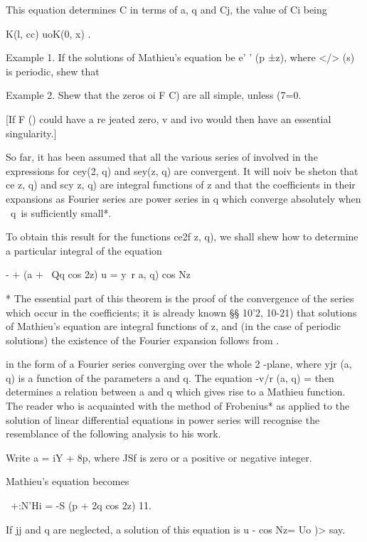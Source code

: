 This equation determines C in terms of a, q and Cj, the value of Ci
being

K(l, cc) uoK(0, x) .

Example 1. If the solutions of Mathieu's equation be e' ' (p ±z),
where </> (s) is periodic, shew that

Example 2. Shew that the zeros oi F C) are all simple, unless (7=0.


[If F () could have a re jeated zero, v and ivo would then have an
essential singularity.]


So far, it has been assumed that all the various series of 
involved in the expressions for cey(2, q) and sey(z, q) are
convergent. It will noiv be sheton that ce z, q) and scy z, q) are
integral functions of z and that the coefficients in their expansions
as Fourier series are power series in q which converge absolutely when
\ q\ is sufficiently small*.

To obtain this result for the functions ce2f z, q), we shall shew how
to determine a particular integral of the equation

- + (a + \ Qq cos 2z) u = y\ r a, q) cos Nz

* The essential part of this theorem is the proof of the convergence
of the series which occur in the coefficients; it is already known §§
10'2, 10-21) that solutions of Mathieu's equation are integral
functions of z, and (in the case of periodic solutions) the existence
of the Fourier expansion follows from .

%
%

in the form of a Fourier series converging over the whole 2 -plane,
where yjr (a, q) is a function of the parameters a and q. The equation
-v/r (a, q) = then determines a relation between a and q which gives
rise to a Mathieu function. The reader who is acquainted with the
method of Frobenius* as applied to the solution of linear differential
equations in power series will recognise the resemblance of the
following analysis to his work.

Write a = iY + 8p, where JSf is zero or a positive or negative
integer.

Mathieu's equation becomes

 \ +:N'Hi = -S (p + 2q cos 2z) 11.

If jj and q are neglected, a solution of this equation is u - cos Nz=
Uo )> say.

